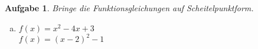\documentclass[12pt,fleqn]{article}
\theoremstyle{aufg}
\newtheorem{aufgabe}{Aufgabe}
\theoremstyle{bsp}
\begin{document}
\begin{flushleft}
\begin{aufgabe}
Bringe die Funktionsgleichungen auf Scheitelpunktform. \\ 
\begin{multicols}{3} 
\begin{enumerate}[a)] 
\item 
$f(x)=x^{2} - 4 x + 3$ \\ 
$f(x)=\left(x - 2\right)^{2} - 1$ \\ 

\end{enumerate} 
\end{multicols} 
\end{aufgabe} 
\end{flushleft} 
    
\end{document}
